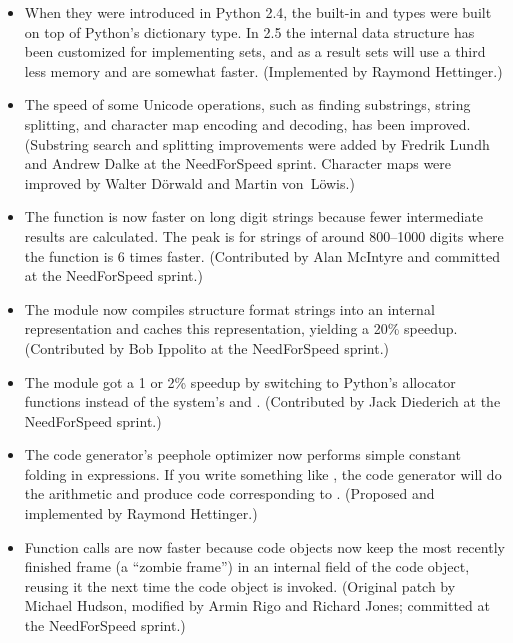 \documentclass{howto}
\begin{document}
\begin{itemize}

\item When they were introduced 
in Python 2.4, the built-in  and  types
were built on top of Python's dictionary type.  
In 2.5 the internal data structure has been customized for implementing sets,
and as a result sets will use a third less memory and are somewhat faster.
(Implemented by Raymond Hettinger.)

\item The speed of some Unicode operations, such as finding
substrings, string splitting, and character map encoding and decoding,
has been improved.  (Substring search and splitting improvements were
added by Fredrik Lundh and Andrew Dalke at the NeedForSpeed
sprint. Character maps were improved by Walter D\"orwald and
Martin von~L\"owis.)

\item The  function is now
faster on long digit strings because fewer intermediate results are
calculated.  The peak is for strings of around 800--1000 digits where 
the function is 6 times faster.
(Contributed by Alan McIntyre and committed at the NeedForSpeed sprint.)

\item The  module now compiles structure format 
strings into an internal representation and caches this
representation, yielding a 20\% speedup.  (Contributed by Bob Ippolito
at the NeedForSpeed sprint.)

\item The  module got a 1 or 2\% speedup by switching to 
Python's allocator functions instead of the system's 
 and .
(Contributed by Jack Diederich at the NeedForSpeed sprint.)

\item The code generator's peephole optimizer now performs
simple constant folding in expressions.  If you write something like
, the code generator will do the arithmetic and produce
code corresponding to .  (Proposed and implemented 
by Raymond Hettinger.)

\item Function calls are now faster because code objects now keep 
the most recently finished frame (a ``zombie frame'') in an internal
field of the code object, reusing it the next time the code object is
invoked.  (Original patch by Michael Hudson, modified by Armin Rigo
and Richard Jones; committed at the NeedForSpeed sprint.)


\end{itemize}
\end{document}
